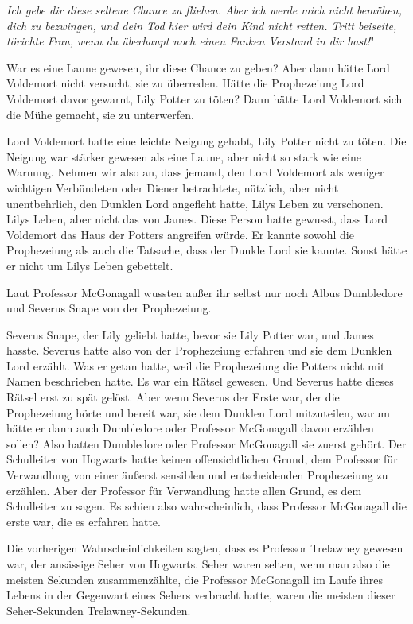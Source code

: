 \glqq \emph{Ich gebe dir diese seltene Chance zu fliehen. Aber ich werde mich
nicht bemühen, dich zu bezwingen, und dein Tod hier wird dein Kind nicht retten.
Tritt beiseite, törichte Frau, wenn du überhaupt noch einen Funken Verstand in
dir hast!}"

War es eine Laune gewesen, ihr diese Chance zu geben? Aber dann hätte Lord
Voldemort nicht versucht, sie zu überreden. Hätte die Prophezeiung Lord
Voldemort davor gewarnt, Lily Potter zu töten? Dann hätte Lord Voldemort sich
die Mühe gemacht, sie zu unterwerfen.

Lord Voldemort hatte eine leichte Neigung gehabt, Lily Potter nicht zu töten.
Die Neigung war stärker gewesen als eine Laune, aber nicht so stark wie eine
Warnung. Nehmen wir also an, dass jemand, den Lord Voldemort als weniger
wichtigen Verbündeten oder Diener betrachtete, nützlich, aber nicht
unentbehrlich, den Dunklen Lord angefleht hatte, Lilys Leben zu verschonen.
Lilys Leben, aber nicht das von James. Diese Person hatte gewusst, dass Lord
Voldemort das Haus der Potters angreifen würde. Er kannte sowohl die
Prophezeiung als auch die Tatsache, dass der Dunkle Lord sie kannte. Sonst hätte
er nicht um Lilys Leben gebettelt.

Laut Professor McGonagall wussten außer ihr selbst nur noch Albus Dumbledore und
Severus Snape von der Prophezeiung.

Severus Snape, der Lily geliebt hatte, bevor sie Lily Potter war, und James
hasste. Severus hatte also von der Prophezeiung erfahren und sie dem Dunklen
Lord erzählt. Was er getan hatte, weil die Prophezeiung die Potters nicht mit
Namen beschrieben hatte. Es war ein Rätsel gewesen. Und Severus hatte dieses
Rätsel erst zu spät gelöst. Aber wenn Severus der Erste war, der die
Prophezeiung hörte und bereit war, sie dem Dunklen Lord mitzuteilen, warum hätte
er dann auch Dumbledore oder Professor McGonagall davon erzählen sollen? Also
hatten Dumbledore oder Professor McGonagall sie zuerst gehört. Der Schulleiter
von Hogwarts hatte keinen offensichtlichen Grund, dem Professor für Verwandlung
von einer äußerst sensiblen und entscheidenden Prophezeiung zu erzählen. Aber
der Professor für Verwandlung hatte allen Grund, es dem Schulleiter zu sagen. Es
schien also wahrscheinlich, dass Professor McGonagall die erste war, die es
erfahren hatte.

Die vorherigen Wahrscheinlichkeiten sagten, dass es Professor Trelawney gewesen
war, der ansässige Seher von Hogwarts. Seher waren selten, wenn man also die
meisten Sekunden zusammenzählte, die Professor McGonagall im Laufe ihres Lebens
in der Gegenwart eines Sehers verbracht hatte, waren die meisten dieser
Seher-Sekunden Trelawney-Sekunden.

